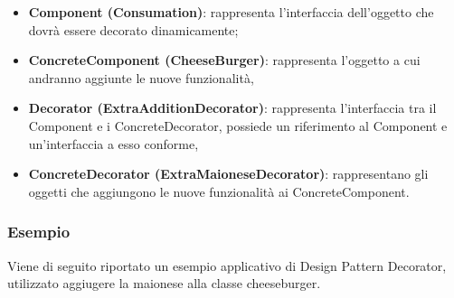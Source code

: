 \documentclass[a4paper,10pt]{article}
\begin{document}
    \begin{itemize}
        \item \textbf{Component (Consumation)}: rappresenta l’interfaccia dell’oggetto che dovrà essere decorato dinamicamente;
        \item \textbf{ConcreteComponent (CheeseBurger)}: rappresenta l’oggetto a cui andranno aggiunte le nuove funzionalità,
        \item \textbf{Decorator (ExtraAdditionDecorator)}: rappresenta l’interfaccia tra il Component e i ConcreteDecorator,
        possiede un riferimento al Component e un’interfaccia a esso conforme,
        \item \textbf{ConcreteDecorator (ExtraMaioneseDecorator)}: rappresentano gli oggetti che aggiungono le
        nuove funzionalità ai ConcreteComponent.
    \end{itemize}
    
    \newpage
    \subsubsection{Esempio}
    Viene di seguito riportato un esempio applicativo di Design Pattern Decorator, utilizzato aggiugere la maionese alla classe cheeseburger.
\end{document}

